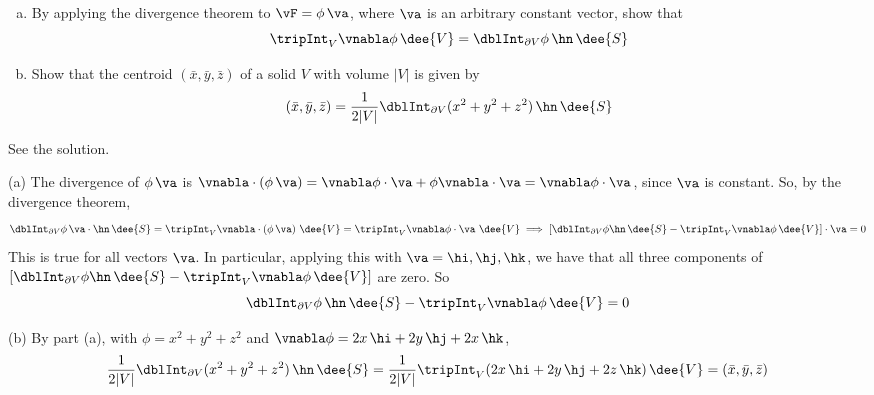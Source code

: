 \begin{solution}
\end{solution}

\goodbreak
\begin{question}
\begin{enumerate}[(a)]
\item
By applying the divergence theorem to $\vF=\phi\,\va$,
where $\va$ is an arbitrary constant vector, show that
\begin{equation*}
\tripInt_V \vnabla\phi\,\dee{V}=\dblInt_{\partial V}\phi\,\hn\,\dee{S}
\end{equation*}
\item 
Show that the centroid $(\bar x,\bar y,\bar z)$ of a solid $V$
with volume $|V|$ is given by
\begin{equation*}
(\bar x,\bar y,\bar z)=\frac{1}{2|V|}\dblInt_{\partial V} (x^2+y^2+z^2)\,\hn\,\dee{S}
\end{equation*}
\end{enumerate}
\end{question}

%

\begin{answer} 
See the solution.
\end{answer}

\begin{solution} 
(a) The divergence of $\phi\,\va$ is 
$\vnabla\cdot(\phi\,\va)
=\vnabla\phi\cdot\va+\phi\vnabla\cdot\va=\vnabla\phi\cdot\va$, since $\va$ is
constant. So, by
the divergence theorem, 
\begin{equation*}
\dblInt_{\partial V}\phi\,\va\cdot\hn\,\dee{S}
=\tripInt_V\vnabla\cdot(\phi\,\va)\ \dee{V}
=\tripInt_V \vnabla\phi\cdot\va\ \dee{V}
\implies \left[\dblInt_{\partial V}\phi\hn\,\dee{S}
         -\tripInt_V \vnabla\phi\,\dee{V}\right]\cdot\va=0
\end{equation*}
This is true for all vectors $\va$. In particular, applying this with
$\va=\hi,\hj,\hk$, we have that all three components of 
$\left[\dblInt_{\partial V}\phi\hn\,\dee{S}
         -\tripInt_V \vnabla\phi\,\dee{V}\right]$ are zero.
So 
\begin{equation*}
\dblInt_{\partial V}\phi\,\hn\,\dee{S}-\tripInt_V \vnabla\phi\,\dee{V}=0
\end{equation*}

(b) By part (a), with $\phi=x^2+y^2+z^2$ and 
$\vnabla\phi = 2x\,\hi+2y\,\hj+2x\,\hk$,
\begin{equation*}
\frac{1}{2|V|}\dblInt_{\partial V} (x^2+y^2+z^2)\,\hn\,\dee{S}
=\frac{1}{2|V|} \tripInt_V (2x\,\hi+2y\,\hj+2z\,\hk)\,\dee{V}
=(\bar x,\bar y,\bar z)
\end{equation*}
\end{solution}



